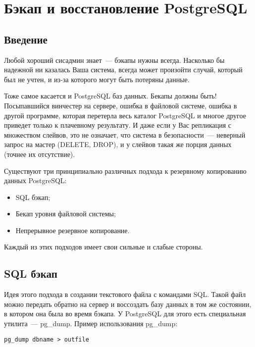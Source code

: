 \chapter{Бэкап и восстановление PostgreSQL}
\begin{epigraphs}
\end{epigraphs}
\section{Введение}
Любой хороший сисадмин знает~--- бэкапы нужны всегда. 
Насколько бы надежной ни казалась Ваша система, всегда может произойти случай, который был не учтен, и из-за которого 
могут быть потеряны данные.

Тоже самое касается и PostgreSQL баз данных. Бекапы должны быть! Посыпавшийся винчестер на сервере, ошибка в файловой системе, 
ошибка в другой программе, которая перетерла весь каталог PostgreSQL и многое другое приведет только к плачевному результату.
И даже если у Вас репликация с множеством слейвов, 
это не означает, что система в безопасности~--- неверный запрос на мастер (DELETE, DROP), и у слейвов такая же порция данных 
(точнее их отсутствие). 

Существуют три принципиально различных подхода к резервному копированию данных PostgreSQL:
\begin{itemize}
\item SQL бэкап;
\item Бекап уровня файловой системы;
\item Непрерывное резервное копирование.
\end{itemize}
Каждый из этих подходов имеет свои сильные и слабые стороны.


\section{SQL бэкап}
Идея этого подхода в создании текстового файла с командами SQL. Такой файл можно передать обратно на сервер 
и воссоздать базу данных в том же состоянии, в котором она была во время бэкапа. 
У PostgreSQL для этого есть специальная утилита~--- pg\_dump. Пример использования pg\_dump:
\begin{lstlisting}[label=lst:backups1,caption=Создаем бэкап с помощью pg\_dump]
pg_dump dbname > outfile
\end{lstlisting}

